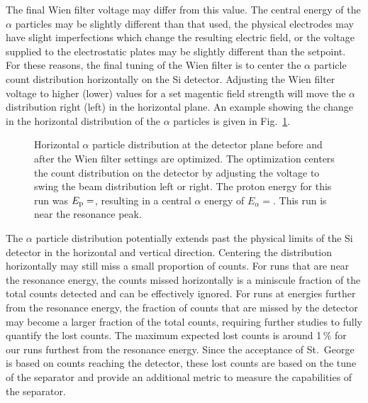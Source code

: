 The final Wien filter voltage may differ from this value. The central
energy of the $\alpha$ particles may be slightly different than that
used, the physical electrodes may have slight imperfections which change
the resulting electric field, or the voltage supplied to the
electrostatic plates may be slightly different than the setpoint. For
these reasons, the final tuning of the Wien filter is to center the
$\alpha$ particle count distribution horizontally on the Si detector.
Adjusting the Wien filter voltage to higher (lower) values for a set
magentic field strength will move the $\alpha$ distribution right (left)
in the horizontal plane. An example showing the change in the horizontal
distribution of the $\alpha$ particles is given in
Fig.~\ref{fig:wf-not-optimal}.

\begin{figure}
    \begin{center}
        \label{fig:wf-not-optimal}
        \caption[Horizontal $\alpha$ particle distribution]{Horizontal
            $\alpha$ particle distribution at the detector plane before
            and after the Wien filter settings are optimized. The
            optimization centers the count distribution on the detector
            by adjusting the voltage to swing the beam distribution left
            or right. The proton energy for this run was
            $E_{\rm p} = $, resulting in a central $\alpha$ energy of
            $E_{\alpha} = $. This run is near the resonance peak.}
    \end{center}
\end{figure}

The $\alpha$ particle distribution potentially extends past the physical
limits of the Si detector in the horizontal and vertical direction.
Centering the distribution horizontally may still miss a small
proportion of counts. For runs that are near the resonance energy, the
counts missed horizontally is a miniscule fraction of the total counts
detected and can be effectively ignored. For runs at energies further
from the resonance energy, the fraction of counts that are missed by the
detector may become a larger fraction of the total counts, requiring
further studies to fully quantify the lost counts. The maximum expected
lost counts is around 1\,\% for our runs furthest from the resonance
energy. Since the acceptance of St.\ George is based on counts reaching
the detector, these lost counts are based on the tune of the separator
and provide an additional metric to measure the capabilities of the
separator.

